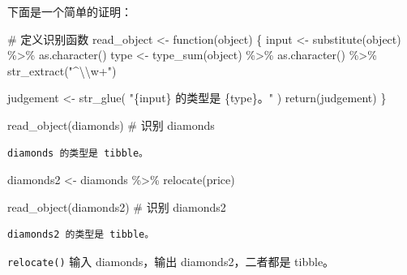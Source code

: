\documentclass[
  letterpaper,
]{ctexbook}
\newenvironment{Shaded}{\begin{snugshade}}{\end{snugshade}}
\newcommand{\CommentTok}[1]{\textcolor[rgb]{0.37,0.37,0.37}{#1}}
\newcommand{\ControlFlowTok}[1]{\textcolor[rgb]{0.00,0.23,0.31}{#1}}
\newcommand{\FunctionTok}[1]{\textcolor[rgb]{0.28,0.35,0.67}{#1}}
\newcommand{\NormalTok}[1]{\textcolor[rgb]{0.00,0.23,0.31}{#1}}
\newcommand{\OtherTok}[1]{\textcolor[rgb]{0.00,0.23,0.31}{#1}}
\newcommand{\SpecialCharTok}[1]{\textcolor[rgb]{0.37,0.37,0.37}{#1}}
\newcommand{\StringTok}[1]{\textcolor[rgb]{0.13,0.47,0.30}{#1}}
\begin{document}
下面是一个简单的证明：

\begin{Shaded}
\begin{Highlighting}[]
\CommentTok{\# 定义识别函数}
\NormalTok{read\_object }\OtherTok{\textless{}{-}} \ControlFlowTok{function}\NormalTok{(object) \{}
\NormalTok{  input }\OtherTok{\textless{}{-}} \FunctionTok{substitute}\NormalTok{(object) }\SpecialCharTok{\%\textgreater{}\%}
    \FunctionTok{as.character}\NormalTok{()}
\NormalTok{  type }\OtherTok{\textless{}{-}} \FunctionTok{type\_sum}\NormalTok{(object) }\SpecialCharTok{\%\textgreater{}\%}
    \FunctionTok{as.character}\NormalTok{() }\SpecialCharTok{\%\textgreater{}\%}
    \FunctionTok{str\_extract}\NormalTok{(}\StringTok{"\^{}}\SpecialCharTok{\textbackslash{}\textbackslash{}}\StringTok{w+"}\NormalTok{)}

\NormalTok{  judgement }\OtherTok{\textless{}{-}} \FunctionTok{str\_glue}\NormalTok{(}
    \StringTok{"\{input\} 的类型是 \{type\}。"}
\NormalTok{  )}
  \FunctionTok{return}\NormalTok{(judgement)}
\NormalTok{\}}
\end{Highlighting}
\end{Shaded}

\begin{Shaded}
\begin{Highlighting}[]
\FunctionTok{read\_object}\NormalTok{(diamonds) }\CommentTok{\# 识别 diamonds}
\end{Highlighting}
\end{Shaded}

\begin{verbatim}
diamonds 的类型是 tibble。
\end{verbatim}

\begin{Shaded}
\begin{Highlighting}[]
\NormalTok{diamonds2 }\OtherTok{\textless{}{-}}\NormalTok{ diamonds }\SpecialCharTok{\%\textgreater{}\%}
  \FunctionTok{relocate}\NormalTok{(price)}

\FunctionTok{read\_object}\NormalTok{(diamonds2) }\CommentTok{\# 识别 diamonds2}
\end{Highlighting}
\end{Shaded}

\begin{verbatim}
diamonds2 的类型是 tibble。
\end{verbatim}

\begin{tcolorbox}[enhanced jigsaw, bottomtitle=1mm, bottomrule=.15mm, coltitle=black, title=\textcolor{quarto-callout-tip-color}{\faLightbulb}\hspace{0.5em}{提示}, toptitle=1mm, colframe=quarto-callout-tip-color-frame, colbacktitle=quarto-callout-tip-color!10!white, opacitybacktitle=0.6, arc=.35mm, opacityback=0, breakable, toprule=.15mm, left=2mm, titlerule=0mm, rightrule=.15mm, colback=white, leftrule=.75mm]

\texttt{relocate()} 输入 diamonds，输出 diamonds2，二者都是 tibble。

\end{tcolorbox}
\end{document}
